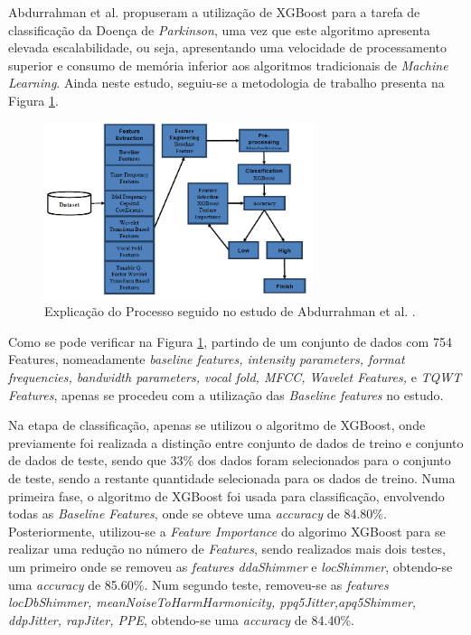 \documentclass[12pt,a4paper,twoside]{report}
\begin{document}
{Abdurrahman et al. \cite{Abdurrahman} propuseram a utilização de \gls{XGBoost} para a tarefa de classificação da Doença de \textit{Parkinson}, uma vez que este algoritmo apresenta elevada escalabilidade, ou seja, apresentando uma velocidade de processamento superior e consumo de memória inferior aos algoritmos tradicionais de \textit{Machine Learning}. Ainda neste estudo, seguiu-se a metodologia de trabalho presenta na Figura \ref{fig:abdu}.

\begin{figure}[H]
    \centering
    \includegraphics[width=0.7\textwidth]{imagens/abdu.png}
    \caption{Explicação do Processo seguido no estudo de Abdurrahman et al. \cite{Abdurrahman}.}
    \label{fig:abdu}
\end{figure}

Como se pode verificar na Figura \ref{fig:abdu}, partindo de um conjunto de dados com 754 Features, nomeadamente \textit{baseline features, intensity parameters, format frequencies, bandwidth parameters, vocal fold, MFCC, Wavelet Features, }e \textit{TQWT Features}, apenas se procedeu com a utilização das \textit{Baseline features} no estudo.

Na etapa de classificação, apenas se utilizou o algoritmo de \gls{XGBoost}, onde previamente foi realizada a distinção entre conjunto de dados de treino e conjunto de dados de teste, sendo que 33\% dos dados foram selecionados para o conjunto de teste, sendo a restante quantidade selecionada para os dados de treino. Numa primeira fase, o algoritmo de \gls{XGBoost} foi usada para classificação, envolvendo todas as \textit{Baseline Features}, onde se obteve uma \textit{accuracy} de 84.80\%. Posteriormente, utilizou-se a \textit{Feature Importance} do algorimo \gls{XGBoost} para se realizar uma redução no número de \textit{Features}, sendo realizados mais dois testes, um primeiro onde se removeu as \textit{features ddaShimmer} e \textit{locShimmer}, obtendo-se uma \textit{accuracy} de 85.60\%. Num segundo teste, removeu-se as \textit{features locDbShimmer, meanNoiseToHarmHarmonicity, ppq5Jitter,apq5Shimmer, ddpJitter, rapJiter, PPE}, obtendo-se uma \textit{accuracy} de 84.40\%. 

}
\end{document}
